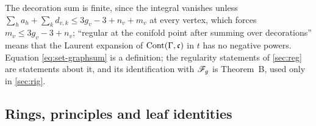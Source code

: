 The decoration sum is finite, since the integral vanishes unless $\sum_ha_h+\sum_kd_{v,k}\leq3g_v-3+n_v+m_v$ at every vertex, which forces $m_v\leq3g_v-3+n_v$; ``regular at the conifold point after summing over decorations'' means that the Laurent expansion of $\mathrm{Cont}(\Gamma,\mathfrak{c})$ in $t$ has no negative powers. Equation \eqref{eq:set-graphsum} is a definition; the regularity statements of \cref{sec:reg} are statements about it, and its identification with $\mathscr{F}_g$ is Theorem~B, used only in \cref{sec:rig}.

\subsection{Rings, principles and leaf identities}
\label{sec:set-rings}


